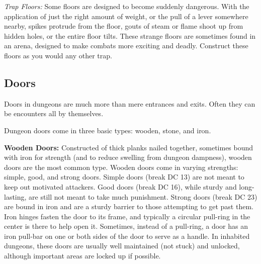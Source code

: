 \textit{Trap Floors:} Some floors are designed to become suddenly dangerous. With the application of just the right amount of weight, or the pull of a lever somewhere nearby, spikes protrude from the floor, gouts of steam or flame shoot up from hidden holes, or the entire floor tilts. These strange floors are sometimes found in an arena, designed to make combats more exciting and deadly. Construct these floors as you would any other trap.

\subsection{Doors}
Doors in dungeons are much more than mere entrances and exits. Often they can be encounters all by themselves.

Dungeon doors come in three basic types: wooden, stone, and iron.


\textbf{Wooden Doors:} Constructed of thick planks nailed together, sometimes bound with iron for strength (and to reduce swelling from dungeon dampness), wooden doors are the most common type. Wooden doors come in varying strengths: simple, good, and strong doors. Simple doors (break DC 13) are not meant to keep out motivated attackers. Good doors (break DC 16), while sturdy and long-lasting, are still not meant to take much punishment. Strong doors (break DC 23) are bound in iron and are a sturdy barrier to those attempting to get past them. Iron hinges fasten the door to its frame, and typically a circular pull-ring in the center is there to help open it. Sometimes, instead of a pull-ring, a door has an iron pull-bar on one or both sides of the door to serve as a handle. In inhabited dungeons, these doors are usually well maintained (not stuck) and unlocked, although important areas are locked up if possible.

